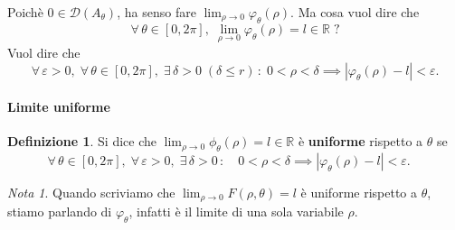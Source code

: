 \documentclass{article}
\theoremstyle{plain}
\theoremstyle{definition}
\newtheorem{defn}{Definizione}[section]
\theoremstyle{remark}
\newtheorem{note}{Nota}
\begin{document}
% 

\vspace{10pt}

Poichè $0\in\mathcal{D}(A_\theta)$, ha senso fare $\lim_{\rho\to0}\varphi_\theta(\rho)$. 
Ma cosa vuol dire che 
\[\forall\,\theta\in[0,2\pi],\; \lim_{\rho\to0}\varphi_\theta(\rho)=l\in\mathbb{R}\;?\]
Vuol dire che 
\[\forall\,\varepsilon>0,\;\forall\,\theta\in[0,2\pi],\;\exists\,\delta>0\;(\delta\leq r)\,:\; 0<\rho<\delta\implies|\varphi_\theta(\rho)-l|<\varepsilon.\]

\vspace{10pt}

\paragraph{Limite uniforme}
\begin{bxthm}
\begin{defn}
Si dice che $\lim_{\rho\to0}\phi_\theta(\rho)=l\in\mathbb{R}$ è \textbf{uniforme} rispetto a $\theta$ se 
\[\forall\,\theta\in[0,2\pi],\;\forall\,\varepsilon>0,\;\exists\,\delta>0\,:\quad 0<\rho<\delta\implies|\varphi_\theta(\rho)-l|<\varepsilon.\quad\]
\end{defn}
\end{bxthm}

\vspace{10pt}

\begin{note}
Quando scriviamo che $\lim_{\rho\to0}F(\rho,\theta)=l$ è uniforme rispetto a $\theta$, stiamo parlando di $\varphi_\theta$, infatti è il limite di una sola variabile $\rho$.
\end{note}

\vspace{10pt}
\end{document}
